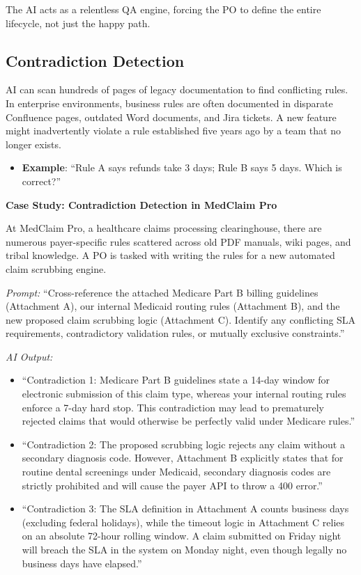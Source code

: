 The AI acts as a relentless QA engine, forcing the PO to define the
entire lifecycle, not just the happy path.

\subsection{Contradiction Detection}\label{contradiction-detection}

AI can scan hundreds of pages of legacy documentation to find
conflicting rules. In enterprise environments, business rules are often
documented in disparate Confluence pages, outdated Word documents, and
Jira tickets. A new feature might inadvertently violate a rule
established five years ago by a team that no longer exists.

\begin{itemize}
\tightlist
\item
  \textbf{Example}: ``Rule A says refunds take 3 days; Rule B says 5
  days. Which is correct?''
\end{itemize}

\textbf{Case Study: Contradiction Detection in MedClaim Pro}

At MedClaim Pro, a healthcare claims processing clearinghouse, there are
numerous payer-specific rules scattered across old PDF manuals, wiki
pages, and tribal knowledge. A PO is tasked with writing the rules for a
new automated claim scrubbing engine.

\emph{Prompt:} ``Cross-reference the attached Medicare Part B billing
guidelines (Attachment A), our internal Medicaid routing rules
(Attachment B), and the new proposed claim scrubbing logic (Attachment
C). Identify any conflicting SLA requirements, contradictory validation
rules, or mutually exclusive constraints.''

\emph{AI Output:}

\begin{itemize}
\tightlist
\item
  ``Contradiction 1: Medicare Part B guidelines state a 14-day window
  for electronic submission of this claim type, whereas your internal
  routing rules enforce a 7-day hard stop. This contradiction may lead
  to prematurely rejected claims that would otherwise be perfectly valid
  under Medicare rules.''
\item
  ``Contradiction 2: The proposed scrubbing logic rejects any claim
  without a secondary diagnosis code. However, Attachment B explicitly
  states that for routine dental screenings under Medicaid, secondary
  diagnosis codes are strictly prohibited and will cause the payer API
  to throw a 400 error.''
\item
  ``Contradiction 3: The SLA definition in Attachment A counts business
  days (excluding federal holidays), while the timeout logic in
  Attachment C relies on an absolute 72-hour rolling window. A claim
  submitted on Friday night will breach the SLA in the system on Monday
  night, even though legally no business days have elapsed.''
\end{itemize}

